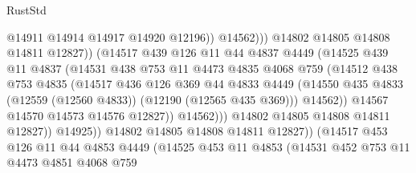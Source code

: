 \begin{lexlean}{RustStd}
\begin{coremodule}
                                      @14911
                                      @14914
                                      @14917
                                      @14920
                                      @12196))
                                  @14562)))
                            @14802
                            @14805
                            @14808
                            @14811
                            @12827))
                        (@14517
                          @439
                          @126
                          @11
                          @44
                          @4837
                          @4449
                          (@14525
                            @439
                            @11
                            @4837
                            (@14531
                              @438
                              @753
                              @11
                              @4473
                              @4835
                              @4068
                              @759
                              (@14512
                                @438
                                @753
                                @4835
                                (@14517
                                  @436
                                  @126
                                  @369
                                  @44
                                  @4833
                                  @4449
                                  (@14550
                                    @435
                                    @4833
                                    (@12559 (@12560 @4833))
                                    (@12190 (@12565 @435 @369)))
                                  @14562))
                              @14567
                              @14570
                              @14573
                              @14576
                              @12827))
                          @14562)))
                    @14802
                    @14805
                    @14808
                    @14811
                    @12827))
                @14925))
            @14802
            @14805
            @14808
            @14811
            @12827))
        (@14517
          @453
          @126
          @11
          @44
          @4853
          @4449
          (@14525
            @453
            @11
            @4853
            (@14531
              @452
              @753
              @11
              @4473
              @4851
              @4068
              @759

\end{coremodule}
\end{lexlean}
